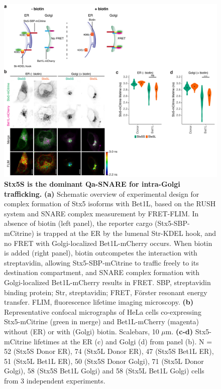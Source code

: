 \begin{figure}
    \includegraphics[keepaspectratio=true,width=\textwidth,height=\textheight]{chapters/chapter6/chapter6_Figure7.pdf}
    \caption{\textbf{Stx5S is the dominant Qa-SNARE for intra-Golgi trafficking.} \textbf{(a)} Schematic overview of experimental design for complex formation of Stx5 isoforms with Bet1L, based on the RUSH system and SNARE complex measurement by FRET-FLIM. In absence of biotin (left panel), the reporter cargo (Stx5-SBP-mCitrine) is trapped at the ER by the lumenal Str-KDEL hook, and no FRET with Golgi-localized Bet1L-mCherry occurs. When biotin is added (right panel), biotin outcompetes the interaction with streptavidin, allowing Stx5-SBP-mCitrine to traffic freely to its destination compartment, and SNARE complex formation with Golgi-localized Bet1L-mCherry results in FRET. SBP, streptavidin binding protein; Str, streptavidin; FRET, Förster resonant energy transfer. FLIM, fluorescence lifetime imaging microscopy. \textbf{(b)} Representative confocal micrographs of HeLa cells co-expressing Stx5-mCitrine (green in merge) and Bet1L-mCherry (magenta) without (ER) or with (Golgi) biotin. Scalebars, 10 $\mu$m. \textbf{(c-d)} Stx5-mCitrine lifetimes at the ER (c) and Golgi (d) from panel (b). N = 52 (Stx5S Donor ER), 74 (Stx5L Donor ER), 47 (Stx5S Bet1L ER), 51 (Stx5L Bet1L ER), 50 (Stx5S Donor Golgi), 71 (Stx5L Donor Golgi), 58 (Stx5S Bet1L Golgi) and 58 (Stx5L Bet1L Golgi) cells from 3 independent experiments. }
    \label{fig:ch6fig7}
\end{figure}

